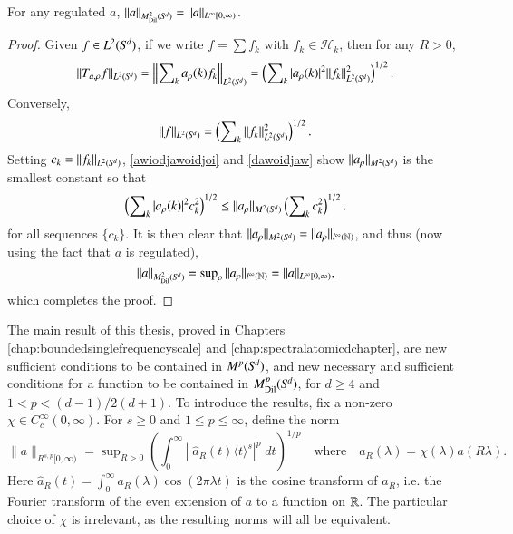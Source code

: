 \begin{lemma} \label{L2M2Lemma}
  For any regulated $a$, $\| a \|_{M^2_{\text{Dil}}({S}^{\!{d}})} = \| a \|_{L^\infty[0,\infty)}$.
\end{lemma}
\begin{proof}
  Given $f \in L^2({S}^{\!{d}})$, if we write $f = \sum f_k$ with $f_k \in \mathcal{H}_k$, then for any $R > 0$,
  \begin{equation} \label{awiodjawoidjoi}
    \| T_{a,\rho} f \|_{L^2({S}^{\!{d}})} = \left\| \sum\nolimits_k a_\rho(k) f_k \right\|_{L^2({S}^{\!{d}})} = \left( \sum\nolimits_k |a_\rho(k)|^2 \| f_k \|_{L^2({S}^{\!{d}})}^2 \right)^{1/2}.
  \end{equation}
  Conversely,
  \begin{equation} \label{dawoidjaw}
    \| f \|_{L^2({S}^{\!{d}})} = \left( \sum\nolimits_k \| f_k \|_{L^2({S}^{\!{d}})}^2 \right)^{1/2}.
  \end{equation}
  Setting $c_k = \| f_k \|_{L^2({S}^{\!{d}})}$, \eqref{awiodjawoidjoi} and \eqref{dawoidjaw} show $\| a_\rho \|_{M^2({S}^{\!{d}})}$ is the smallest constant so that
  \begin{equation}
    \left( \sum\nolimits_k |a_\rho(k)|^2 c_k^2 \right)^{1/2} \leq \| a_\rho \|_{M^2({S}^{\!{d}})} \left( \sum\nolimits_k c_k^2 \right)^{1/2}.
  \end{equation}
  for all sequences $\{ c_k \}$. It is then clear that $\| a_\rho \|_{M^2({S}^{\!{d}})} = \| a_\rho \|_{l^\infty(\operatorname{\mathbb{N}})}$, and thus (now using the fact that $a$ is regulated),
  \begin{equation}
    \| a \|_{M^2_{\text{Dil}}({S}^{\!{d}})} = \sup\nolimits_\rho \| a_\rho \|_{l^\infty(\operatorname{\mathbb{N}})} = \| a \|_{L^\infty[0,\infty)},
  \end{equation}
  which completes the proof.
\end{proof}

The main result of this thesis, proved in Chapters \ref{chap:boundedsinglefrequencyscale} and \ref{chap:spectralatomicdchapter}, are new sufficient conditions to be contained in $M^p({S}^{\!{d}})$, and new necessary and sufficient conditions for a function to be contained in $M^p_{\text{Dil}}({S}^{\!{d}})$, for $d \geq 4$ and $1 < p < (d-1)/2(d+1)$. To introduce the results, fix a non-zero $\chi \in C_c^\infty(0,\infty)$. For $s \geq 0$ and $1 \leq p \leq \infty$, define the norm
%
\begin{equation}
  \| a \|_{R^{s,p}[0,\infty)} = \sup\nolimits_{R > 0} \left( \int_0^\infty \left|\;\! \widehat{a}_R(t) \langle t \rangle^s \right|^p\; dt \right)^{1/p} \quad\text{where}\quad a_R(\lambda) = \chi(\lambda) a(R \lambda).
\end{equation}
%
Here $\widehat{a}_R(t) = \int_0^\infty a_R(\lambda) \cos(2 \pi \lambda t)$ is the cosine transform of $a_R$, i.e. the Fourier transform of the even extension of $a$ to a function on $\operatorname{\mathbb{R}}$. The particular choice of $\chi$ is irrelevant, as the resulting norms will all be equivalent. %

